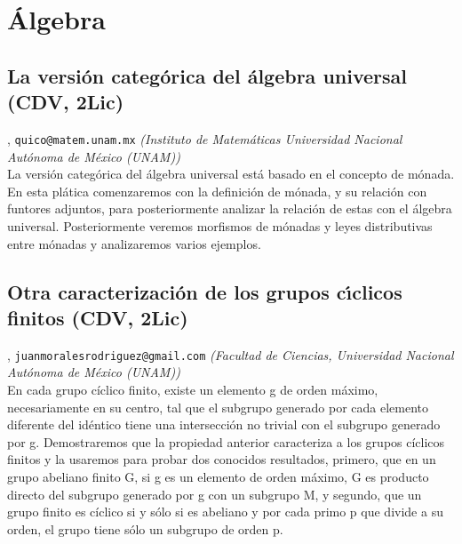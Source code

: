 \section{\'Algebra}

\subsection{\sffamily La versi\'on categ\'orica del \'algebra universal {\footnotesize (CDV, 2Lic)}} \label{reg-1075} 
, {\tt quico@matem.unam.mx}  {\slshape (Instituto de Matem\'aticas  Universidad Nacional Aut\'onoma de M\'exico (UNAM))}\\
\noindent La versi\'on categ\'orica del \'algebra universal est\'a basado en el concepto de m\'onada. En esta pl\'atica comenzaremos con la definici\'on de m\'onada, y su relaci\'on con funtores adjuntos, para posteriormente analizar la relaci\'on de estas con el \'algebra universal. Posteriormente veremos morfismos de m\'onadas y leyes distributivas entre m\'onadas y analizaremos varios ejemplos.
\subsection{\sffamily Otra caracterizaci\'on de los grupos c\'{\i}clicos finitos {\footnotesize (CDV, 2Lic)}} \label{reg-1168} 
, {\tt juanmoralesrodriguez@gmail.com}  {\slshape (Facultad de Ciencias, Universidad Nacional Aut\'onoma de M\'exico (UNAM))}\\
          \noindent En cada grupo c\'iclico finito, existe un elemento g de orden m\'aximo, necesariamente en su centro, tal que el subgrupo generado por cada elemento diferente del id\'entico tiene una intersecci\'on no trivial con el subgrupo generado por g. Demostraremos que la propiedad anterior caracteriza a los grupos c\'iclicos finitos y la usaremos para probar dos conocidos resultados, primero, que en un grupo abeliano finito G, si g  es un elemento de orden m\'aximo, G es producto directo del subgrupo generado por g con un subgrupo M, y segundo, que un grupo finito es c\'iclico si y s\'olo si es abeliano y por cada primo p que divide a su orden, el grupo tiene s\'olo un subgrupo de orden p.
